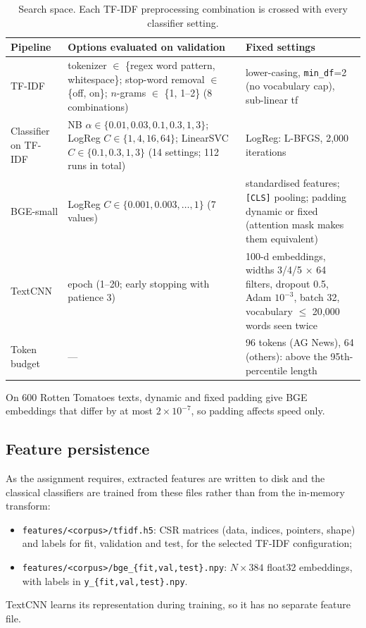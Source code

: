 \begin{table}[H]
\centering
\footnotesize
\caption{Search space. Each TF-IDF preprocessing combination is crossed with every classifier setting.}
\label{tab:grid}
\begin{tabular}{@{}l P{6.2cm} P{5.0cm}@{}}
\toprule
Pipeline & Options evaluated on validation & Fixed settings \\
\midrule
TF-IDF & tokenizer $\in$ \{regex word pattern, whitespace\}; stop-word removal $\in$ \{off, on\}; $n$-grams $\in$ \{1, 1--2\} (8 combinations) & lower-casing, \texttt{min\_df}=2 (no vocabulary cap), sub-linear tf \\
Classifier on TF-IDF & NB $\alpha\in\{0.01,0.03,0.1,0.3,1,3\}$; LogReg $C\in\{1,4,16,64\}$; LinearSVC $C\in\{0.1,0.3,1,3\}$ (14 settings; 112 runs in total) & LogReg: L-BFGS, 2{,}000 iterations \\
BGE-small & LogReg $C\in\{0.001,0.003,\dots,1\}$ (7 values) & standardised features; \texttt{[CLS]} pooling; padding dynamic or fixed (attention mask makes them equivalent) \\
TextCNN & epoch (1--20; early stopping with patience 3) & 100-d embeddings, widths 3/4/5 $\times$ 64 filters, dropout 0.5, Adam $10^{-3}$, batch 32, vocabulary $\le$ 20{,}000 words seen twice \\
Token budget & --- & 96 tokens (AG News), 64 (others): above the 95th-percentile length \\
\bottomrule
\end{tabular}
\end{table}

On 600 Rotten Tomatoes texts, dynamic and fixed padding give BGE embeddings that differ by at most $2\times10^{-7}$, so padding affects speed only.

\subsection{Feature persistence}
As the assignment requires, extracted features are written to disk and the classical classifiers are trained from these files rather than from the in-memory transform:
\begin{itemize}
  \item \texttt{features/<corpus>/tfidf.h5}: CSR matrices (data, indices, pointers, shape) and labels for fit, validation and test, for the selected TF-IDF configuration;
  \item \texttt{features/<corpus>/bge\_\{fit,val,test\}.npy}: $N\times 384$ float32 embeddings, with labels in \texttt{y\_\{fit,val,test\}.npy}.
\end{itemize}
TextCNN learns its representation during training, so it has no separate feature file.

